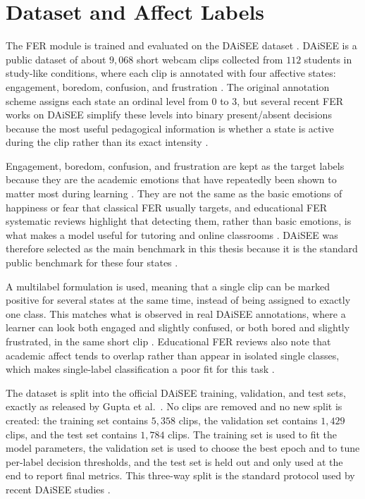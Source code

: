 \section{Dataset and Affect Labels}\label{sec:method_dataset}

The FER module is trained and evaluated on the DAiSEE dataset \cite{gupta_daisee_2016}. DAiSEE is a public dataset of about $9{,}068$ short webcam clips collected from $112$ students in study-like conditions, where each clip is annotated with four affective states: engagement, boredom, confusion, and frustration \cite{gupta_daisee_2016}. The original annotation scheme assigns each state an ordinal level from $0$ to $3$, but several recent FER works on DAiSEE simplify these levels into binary present/absent decisions because the most useful pedagogical information is whether a state is active during the clip rather than its exact intensity \cite{rao_recognition_2021,leong_deep_2020,abedi_improving_2021}.

Engagement, boredom, confusion, and frustration are kept as the target labels because they are the academic emotions that have repeatedly been shown to matter most during learning \cite{dmello_language_2012,pekrun_control-value_2006,tyng_influences_2017}. They are not the same as the basic emotions of happiness or fear that classical FER usually targets, and educational FER systematic reviews highlight that detecting them, rather than basic emotions, is what makes a model useful for tutoring and online classrooms \cite{lek_academic_2023,florestiyanto_emotion_2024,vistorte_integrating_2024}. DAiSEE was therefore selected as the main benchmark in this thesis because it is the standard public benchmark for these four states \cite{lek_academic_2023}.

A multilabel formulation is used, meaning that a single clip can be marked positive for several states at the same time, instead of being assigned to exactly one class. This matches what is observed in real DAiSEE annotations, where a learner can look both engaged and slightly confused, or both bored and slightly frustrated, in the same short clip \cite{gupta_daisee_2016}. Educational FER reviews also note that academic affect tends to overlap rather than appear in isolated single classes, which makes single-label classification a poor fit for this task \cite{lek_academic_2023,florestiyanto_emotion_2024}.

The dataset is split into the official DAiSEE training, validation, and test sets, exactly as released by Gupta et al.\ \cite{gupta_daisee_2016}. No clips are removed and no new split is created: the training set contains $5{,}358$ clips, the validation set contains $1{,}429$ clips, and the test set contains $1{,}784$ clips. The training set is used to fit the model parameters, the validation set is used to choose the best epoch and to tune per-label decision thresholds, and the test set is held out and only used at the end to report final metrics. This three-way split is the standard protocol used by recent DAiSEE studies \cite{abedi_improving_2021,mehta_three-dimensional_2022,su_leveraging_2024}.

